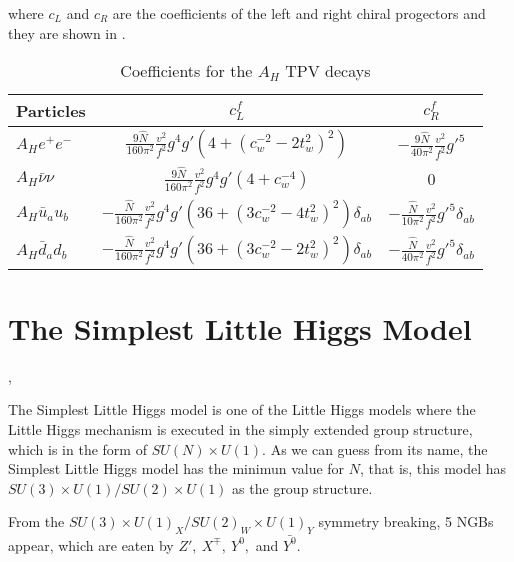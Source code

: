 where $c_L$ and $c_R$ are the coefficients of the left and right chiral progectors 
and they are shown in . 

\begin{table*}%
\begin{center}
 \begin{tabular}{|l|c|c|}
\hline
Particles & $c_{L}^f$ & $c_{R}^f$ \\
\hline
$A_H e^+ e^-$  & $\frac{9 \hat{N}}{160\pi^2} \frac{v^2}{f^2} g^4 g' (4 + (c_w^{-2}-2t_w^2)^2)$ & $-\frac{9\hat{N}}{40\pi^2}\frac{v^2}{f^2} g'^5$  \\[4pt]
$A_H \bar{\nu}\nu$ & $\frac{9 \hat{N}}{160\pi^2} \frac{v^2}{f^2} g^4 g' (4 + c_w^{-4})$ & 0  \\[4pt]
$A_H \bar{u}_a u_b$  & $-\frac{\hat{N}}{160\pi^2} \frac{v^2}{f^2} g^4 g' (36 + (3c_w^{-2}-4t_w^2)^2)\delta_{ab}$ & $-\frac{\hat{N}}{10\pi^2}\frac{v^2}{f^2} g'^5 \delta_{ab}$  \\[4pt]
$A_H \bar{d}_a d_b$  & $-\frac{\hat{N}}{160\pi^2} \frac{v^2}{f^2} g^4 g' (36 + (3c_w^{-2}-2t_w^2)^2)\delta_{ab}$ & $-\frac{\hat{N}}{40\pi^2}\frac{v^2}{f^2} g'^5 \delta_{ab}$  \\[4pt]
\hline
\end{tabular}
\caption{Coefficients for the $A_H$ TPV decays}
\label{tab:TPVcoeffi}
\end{center}
\end{table*}
% 
\section{The Simplest Little Higgs Model}
, 

The Simplest Little Higgs model is one of the Little Higgs models where the Little Higgs mechanism is executed in the simply extended group structure,
which is in the form of $SU(N)\times U(1)$. As we can guess from its name, the Simplest Little Higgs model has the minimun value for $N$,
that is, this model has $SU(3)\times U(1)/ SU(2)\times U(1)$ as the group structure.

From the $SU(3)\times U(1)_X / SU(2)_W \times U(1)_Y $ symmetry breaking, 
 5 NGBs appear, which are eaten by $Z',~X^{\mp},~Y^0,$ and $\bar{Y^0}$.

